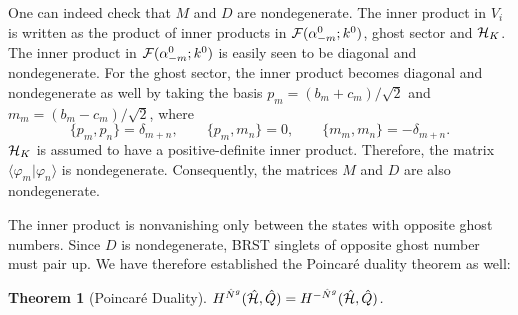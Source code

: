 \documentclass[a4paper,12pt]{article}
\newcommand{\norm}[2]{\mbox{$\langle #1 | #2 \rangle$}}
\newcommand{\hN}{\hat{N}^g}
\newcommand{\hQ}{\hat{Q}}
\newtheorem{theorem}{Theorem}[section]
\begin{document}
One can indeed check that $M$ and $D$ are nondegenerate. 
The inner product in $V_i$ is 
written as the product of inner products in  
${\cal F}(\alpha^{0}_{-m};k^0)$, ghost sector and ${\cal H}_K$.
The inner product in ${\cal F}(\alpha^{0}_{-m};k^0)$ is easily seen 
to be diagonal and nondegenerate.
For the ghost sector, 
the inner product 
becomes diagonal and nondegenerate as well by taking the
basis $ p_{m} = (b_{m}+c_{m})/\sqrt{2} $ and $ m_{m} =
(b_{m}-c_{m})/\sqrt{2} $, 
where
\begin{equation}
%
\{ p_m, p_n \} = \delta_{m+n}, \qquad
\{ p_m, m_n \} = 0, \qquad
\{ m_m, m_n \} = -\delta_{m+n}.
\label{eq:diagonal_basis}
%
\end{equation}
${\cal H}_K$ is assumed to have a positive-definite inner product.
Therefore, the matrix $\norm{\varphi_{m}}{\varphi_{n}}$ is nondegenerate.
Consequently, the matrices $M$ and $D$ are also nondegenerate. 

The inner product is
nonvanishing only between the states with opposite ghost numbers. 
Since $D$ is nondegenerate, BRST singlets of opposite ghost number must 
pair up.
We have therefore established the Poincar\'{e} duality
theorem as well:
\begin{theorem}[Poincar\'{e} Duality]
%
$ H^{\hN}(\hat{\cal H}, \hQ) = H^{-\hN}(\hat{\cal H}, \hQ) $.
\label{lemma:poincare}
%
\end{theorem}
\end{document}
